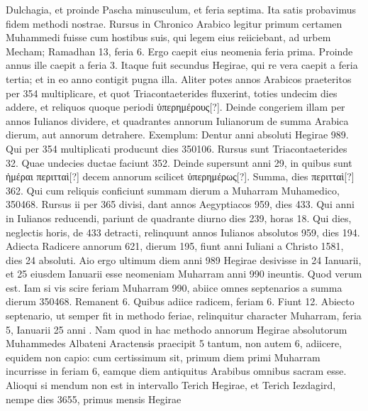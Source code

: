 Dulchagia, et proinde Pascha minusculum, et feria septima.
Ita satis
probavimus fidem methodi nostrae.
Rursus in Chronico Arabico
legitur primum certamen Muhammedi fuisse cum hostibus suis, qui
legem eius reiiciebant, ad urbem Mecham; Ramadhan 13, feria 6.
%
Ergo caepit eius neomenia feria prima.
Proinde annus ille caepit a
feria 3.
Itaque fuit secundus Hegirae, qui re vera caepit a feria tertia; et
in eo anno contigit pugna illa.
Aliter potes annos Arabicos praeteritos
per 354 multiplicare, et quot Triacontaeterides fluxerint, toties undecim
dies addere, et reliquos quoque periodi \textgreek{ὑπερημέρους[?]}.
Deinde
congeriem illam per annos Iulianos dividere, et quadrantes annorum
Iulianorum de summa Arabica dierum, aut annorum detrahere.
Exemplum: Dentur anni absoluti Hegirae 989.
Qui per 354 multiplicati
producunt dies 350106.
Rursus sunt Triacontaeterides 32.
Quae
undecies ductae faciunt 352.
Deinde supersunt anni 29, in quibus sunt
\textgreek{ἡμέραι περιτταὶ[?]} decem annorum scilicet \textgreek{ὑπερημέρως[?]}.
Summa, dies \textgreek{περιτταὶ[?]}
362.
Qui cum reliquis conficiunt summam dierum a Muharram
Muhamedico, 350468. %
Rursus ii per 365 divisi, dant annos Aegyptiacos
959, dies 433.
Qui anni in Iulianos reducendi, pariunt de quadrante
diurno dies 239, horas 18. %
Qui dies, neglectis horis, de 433 detracti,
relinquunt annos Iulianos absolutos 959, dies 194.
Adiecta Radicere
annorum 621, dierum 195, fiunt anni Iuliani a Christo 1581, dies 24 absoluti.
Aio ergo ultimum %
 diem anni 989 Hegirae desivisse in 24 Ianuarii,
et 25 eiusdem Ianuarii esse neomeniam Muharram anni 990 ineuntis.
Quod verum est.
Iam si vis scire feriam Muharram 990, abiice omnes septenarios
a summa dierum 350468.
Remanent 6.
Quibus adiice radicem,
feriam 6.
Fiunt 12.
Abiecto septenario, ut semper fit in methodo
feriae, relinquitur character Muharram, feria 5, Ianuarii 25 anni
. %
Nam quod in hac methodo annorum Hegirae absolutorum
Muhammedes Albateni Aractensis praecipit 5 tantum, non autem
6, adiicere, equidem non capio: cum certissimum sit, primum diem
primi Muharram incurrisse in feriam 6, eamque diem antiquitus Arabibus
omnibus sacram esse.
Alioqui si mendum non %
 est in intervallo Terich
Hegirae, et Terich Iezdagird, nempe dies 3655, primus mensis Hegirae
